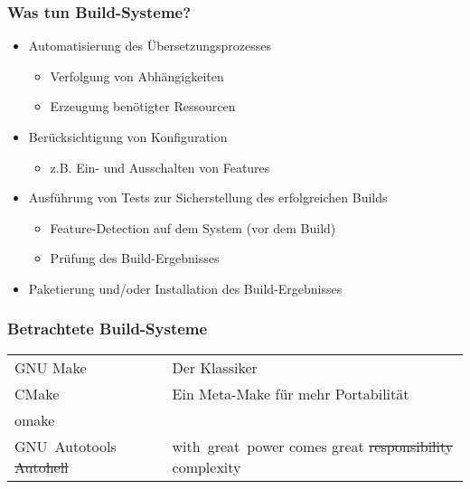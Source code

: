\begin{frame}
	\frametitle{Was tun Build-Systeme?}
	\begin{itemize}
		\pause
		\item Automatisierung des Übersetzungsprozesses
			\begin{itemize}
				\pause
				\item Verfolgung von Abhängigkeiten
				\pause
				\item Erzeugung benötigter Ressourcen
			\end{itemize}
		\pause
		\item Berücksichtigung von Konfiguration
			\begin{itemize}
			\pause
			\item z.B. Ein- und Ausschalten von Features
			\end{itemize}
		\pause
		\item Ausführung von Tests zur Sicherstellung des erfolgreichen Builds
		\begin{itemize}
			\pause
			\item Feature-Detection auf dem System (vor dem Build)
			\pause
			\item Prüfung des Build-Ergebnisses
		\end{itemize}
		\pause
		\item Paketierung und/oder Installation des Build-Ergebnisses
	\end{itemize}
\end{frame}

\begin{frame}
	\frametitle{Betrachtete Build-Systeme}
	\begin{tabular}{p{8em}p{16em}}
	GNU Make & Der Klassiker \\
	CMake & Ein Meta-Make für mehr Portabilität \\
	omake & \\
	\mbox{GNU Autotools} \sout{Autohell} & \mbox{with great power} \linebreak comes great \sout{responsibility} complexity
	\end{tabular}
\end{frame}

